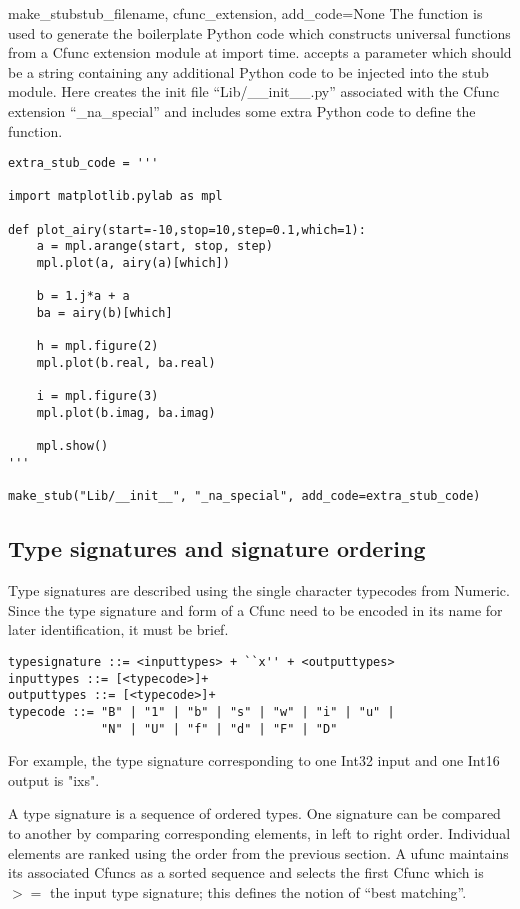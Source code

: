 \begin{funcdesc}{make_stub}{stub_filename, cfunc_extension, add_code=None}
The  function is used to generate the boilerplate Python
code which constructs universal functions from a Cfunc extension module at
import time.   accepts a  parameter which
should be a string containing any additional Python code to be injected into
the stub module.  Here  creates the init file
``Lib/__init__.py'' associated with the Cfunc extension ``_na_special'' and
includes some extra Python code to define the  function.
\begin{verbatim}
extra_stub_code = '''

import matplotlib.pylab as mpl

def plot_airy(start=-10,stop=10,step=0.1,which=1):
    a = mpl.arange(start, stop, step)
    mpl.plot(a, airy(a)[which])

    b = 1.j*a + a
    ba = airy(b)[which]

    h = mpl.figure(2)
    mpl.plot(b.real, ba.real)

    i = mpl.figure(3)
    mpl.plot(b.imag, ba.imag)
    
    mpl.show()
'''

make_stub("Lib/__init__", "_na_special", add_code=extra_stub_code)
\end{verbatim}

\end{funcdesc}

\subsection{Type signatures and signature ordering}

Type signatures are described using the single character typecodes from
Numeric.  Since the type signature and form of a Cfunc need to be encoded in
its name for later identification, it must be brief.  

\begin{verbatim}
typesignature ::= <inputtypes> + ``x'' + <outputtypes>
inputtypes ::= [<typecode>]+
outputtypes ::= [<typecode>]+
typecode ::= "B" | "1" | "b" | "s" | "w" | "i" | "u" |
             "N" | "U" | "f" | "d" | "F" | "D"
\end{verbatim}

For example,  the type signature corresponding to one Int32 input and one Int16
output is "ixs".

A type signature is a sequence of ordered types.  One signature can be compared
to another by comparing corresponding elements, in left to right order.
Individual elements are ranked using the order from the previous section.  A
ufunc maintains its associated Cfuncs as a sorted sequence and selects the
first Cfunc which is \(>=\) the input type signature;  this defines the notion
of ``best matching''.

